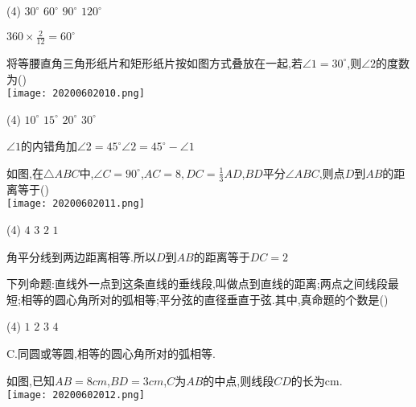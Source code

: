 \documentclass[cn,blue,12pt]{elegantbook}
\renewcommand \tkt[1]{{\CJKunderline[hidden=true, skip=true, thickness=1pt]{#1}}}
\begin{document}
\begin{shiti}
\begin{shiti}
    \begin{tasks}(4)
      \task \(30^\circ\)
      \task \(60^\circ\)
      \task \(90^\circ\)
      \task \(120^\circ\)
    \end{tasks}
\begin{solution}
        \(360 \times \frac{2}{12}=60^\circ\)
\end{solution}
  \item 将等腰直角三角形纸片和矩形纸片按如图方式叠放在一起,若\(\angle 1 =30 ^\circ \),则\(\angle 2\)的度数为(\tkt{B})\\
\texttt{[image: 20200602010.png]}\\
    \begin{tasks}(4)
      \task \(10^\circ\)
      \task \(15^\circ\)
      \task \(20^\circ\)
      \task \(30^\circ\)
    \end{tasks}
\begin{solution}
        \(\angle 1\)的内错角加\(\angle 2 = 45^\circ\)\(\angle 2=45^\circ -\angle 1\)
\end{solution}
  \item 如图,在\(\triangle ABC \)中,\(\angle C=90^\circ\),\(AC =8, DC=\frac{1}{3}AD\),\(BD\)平分\(\angle ABC\),则点\(D\)到\(AB\)的距离等于(\tkt{C})\\
\texttt{[image: 20200602011.png]}\\
    \begin{tasks}(4)
      \task \(4\)
      \task \(3\)
      \task \(2\)
      \task \(1\)
    \end{tasks}
\begin{solution}
角平分线到两边距离相等.所以\(D\)到\(AB\)的距离等于\(DC=2\)
\end{solution}
  \item 下列命题:直线外一点到这条直线的垂线段,叫做点到直线的距离;两点之间线段最短;相等的圆心角所对的弧相等;平分弦的直径垂直于弦.其中,真命题的个数是(\tkt{C})\\
    \begin{tasks}(4)
      \task \(1\)
      \task \(2\)
      \task \(3\)
      \task \(4\)
    \end{tasks}
\begin{solution}
        C.同圆或等圆,相等的圆心角所对的弧相等.
\end{solution}
  \item 如图,已知\( AB = 8 cm\),\(BD=3 cm\),\(C \)为\(AB\)的中点,则线段\(CD\)的长为\tkt{\(1\)}cm.\\
\texttt{[image: 20200602012.png]}\\

\end{shiti}
\end{shiti}
\end{document}
